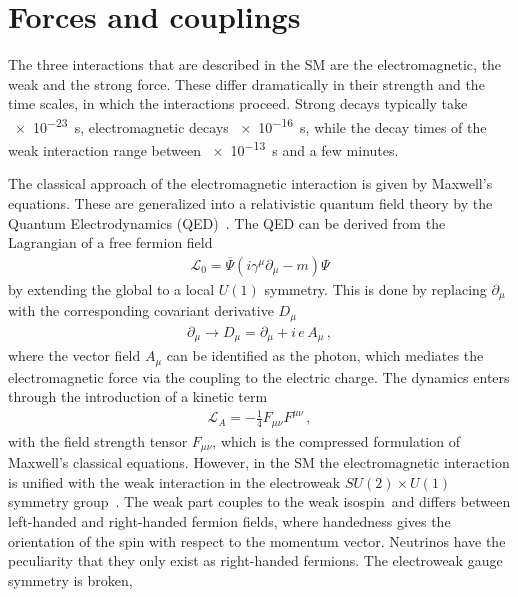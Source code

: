 
\section{Forces and couplings}
\label{sec:standardmodel:forces}

The three interactions that are described in the SM are the electromagnetic,
the weak and the strong force. These differ dramatically in their strength and
the time scales, in which the interactions proceed. Strong decays typically
take \SI{e-23}{\second}, electromagnetic decays \SI{e-16}{\second}, while the
decay times of the weak interaction range between \SI{e-13}{\second} and a few
minutes.

The classical approach of the electromagnetic interaction is given by
Maxwell's equations. These are generalized into a relativistic quantum field
theory by the Quantum Electrodynamics
(QED)~\cite{Tomonaga01081946,Schwinger-QED1,*Schwinger-QED2,Feynman-QED1,*Feynman-QED2,*Feynman-QED3}.
The QED can be derived from the Lagrangian of a free fermion field
\begin{align}
	\mathcal{L}_0 = \overline{\Psi} (i\gamma^\mu \partial_\mu - m) \Psi
\end{align}
by extending the global to a local $U(1)$ symmetry. This is done by replacing
$\partial_\mu$ with the corresponding covariant derivative $D_\mu$
\begin{align}
	\partial_\mu \to D_\mu = \partial_\mu + i\,e\,A_\mu\,,
\end{align}
where the vector field $A_\mu$ can be identified as the photon, which mediates
the electromagnetic force via the coupling to the electric charge. The
dynamics enters through the introduction of a kinetic term
\begin{align}
	\mathcal{L}_A = - \frac 14 F_{\mu\nu}F^{\mu\nu}\,,
\end{align}
with the field strength tensor $F_{\mu\nu}$, which is the compressed
formulation of Maxwell's classical equations. However, in the SM the
electromagnetic interaction is unified with the weak interaction in the
electroweak $SU(2)\times U(1)$ symmetry
group~\cite{Glashow:1961tr,Salam:1964ry,Weinberg:1967tq}. The weak part
couples to the weak isospin~and differs between left-handed and right-handed
fermion fields, where handedness gives the orientation of the spin with
respect to the momentum vector. Neutrinos have the peculiarity that they only
exist as right-handed fermions. The electroweak gauge symmetry is broken,
